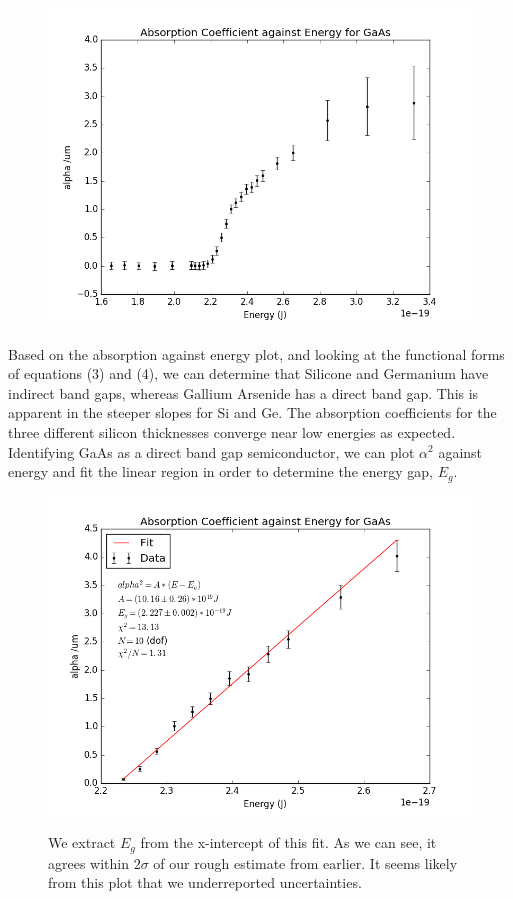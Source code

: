 \documentclass{article}
\begin{document}
\begin{figure}[!htb]
	\centering
	\includegraphics[scale=.75]{plots/GaAs_alpha.png}
 	\label{GaAs_a}
\end{figure}

Based on the absorption against energy plot, and looking at the functional forms of equations (3) and (4), we can determine that Silicone and Germanium have indirect band gaps, whereas Gallium Arsenide has a direct band gap. This is apparent in the steeper slopes for Si and Ge. The absorption coefficients for the three different silicon thicknesses converge near low energies as expected. Identifying GaAs as a direct band gap semiconductor, we can plot $\alpha^2$ against energy and fit the linear region in order to determine the energy gap, $E_g$.

\begin{figure}[!htb]
	\centering
	\includegraphics[scale=.75]{plots/GaAs_alpha_fit.png}
 	\label{GaAs_a}
	\caption{We extract $E_g$ from the x-intercept of this fit. As we can see, it agrees within $2\sigma$ of our rough estimate from earlier. It seems likely from this plot that we underreported uncertainties.}
\end{figure}
\end{document}
